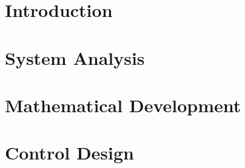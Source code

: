 \documentclass{report}
\begin{document}


\tableofcontents

\listoffigures

\chapter*{Introduction}


\chapter{System Analysis}


\chapter{Mathematical Development}


\chapter{Control Design}


\appendix


\linespread{1.2}
\setlength{\parskip}{1em}

\printbibliography%
\nocite{*}
\end{document}
